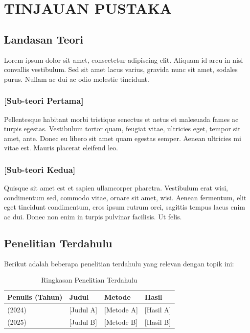 \section{TINJAUAN PUSTAKA}
\onehalfspacing

\subsection{Landasan Teori}
\justifying

Lorem ipsum dolor sit amet, consectetur adipiscing elit. Aliquam id arcu in nisl convallis vestibulum. Sed sit amet lacus varius, gravida nunc sit amet, sodales purus. Nullam ac dui ac odio molestie tincidunt.

\subsubsection{[Sub-teori Pertama]}
\justifying

Pellentesque habitant morbi tristique senectus et netus et malesuada fames ac turpis egestas. Vestibulum tortor quam, feugiat vitae, ultricies eget, tempor sit amet, ante. Donec eu libero sit amet quam egestas semper. Aenean ultricies mi vitae est. Mauris placerat eleifend leo.

\subsubsection{[Sub-teori Kedua]}
\justifying

Quisque sit amet est et sapien ullamcorper pharetra. Vestibulum erat wisi, condimentum sed, commodo vitae, ornare sit amet, wisi. Aenean fermentum, elit eget tincidunt condimentum, eros ipsum rutrum orci, sagittis tempus lacus enim ac dui. Donec non enim in turpis pulvinar facilisis. Ut felis.

\subsection{Penelitian Terdahulu}
\justifying

Berikut adalah beberapa penelitian terdahulu yang relevan dengan topik ini:

\begin{table}[H]
    \centering
    \caption{Ringkasan Penelitian Terdahulu}
    \begin{tabular}{|l|l|l|l|}
    \hline
    \textbf{Penulis (Tahun)} & \textbf{Judul} & \textbf{Metode} & \textbf{Hasil} \\ \hline
    [Penulis A] (2024) & [Judul A] & [Metode A] & [Hasil A] \\ \hline
    [Penulis B] (2025) & [Judul B] & [Metode B] & [Hasil B] \\ \hline
    \end{tabular}
    \label{tab:penelitian_terdahulu}
\end{table}
